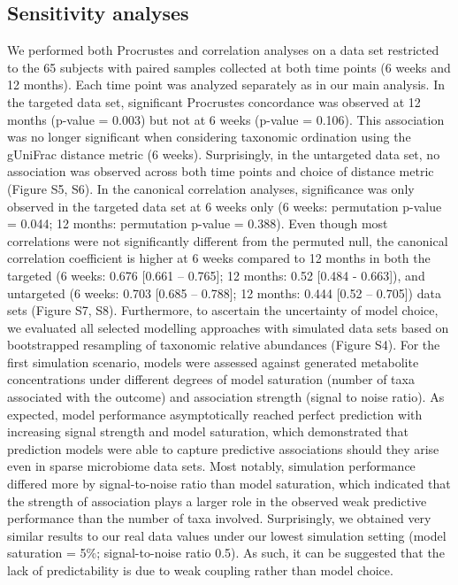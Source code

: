 \subsection{Sensitivity analyses}
We performed both Procrustes and correlation analyses on a data set restricted to the 65 subjects with paired samples collected at both time points (6 weeks and 12 months). Each time point was analyzed separately as in our main analysis. In the targeted data set, significant Procrustes concordance was observed at 12 months (p-value = 0.003) but not at 6 weeks (p-value = 0.106). This association was no longer significant when considering taxonomic ordination using the gUniFrac distance metric (6 weeks). Surprisingly, in the untargeted data set, no association was observed across both time points and choice of distance metric (Figure S5, S6). In the canonical correlation analyses, significance was only observed in the targeted data set at 6 weeks only (6 weeks: permutation p-value = 0.044; 12 months: permutation p-value = 0.388). Even though most correlations were not significantly different from the permuted null, the canonical correlation coefficient is higher at 6 weeks compared to 12 months in both the targeted (6 weeks: 0.676 [0.661 – 0.765]; 12 months: 0.52 [0.484 - 0.663]), and untargeted (6 weeks: 0.703 [0.685 – 0.788]; 12 months: 0.444 [0.52 – 0.705]) data sets (Figure S7, S8). 
Furthermore, to ascertain the uncertainty of model choice, we evaluated all selected modelling approaches with simulated data sets based on bootstrapped resampling of taxonomic relative abundances (Figure S4). For the first simulation scenario, models were assessed against generated metabolite concentrations under different degrees of model saturation (number of taxa associated with the outcome) and association strength (signal to noise ratio). As expected, model performance asymptotically reached perfect prediction with increasing signal strength and model saturation, which demonstrated that prediction models were able to capture predictive associations should they arise even in sparse microbiome data sets. Most notably, simulation performance differed more by signal-to-noise ratio than model saturation, which indicated that the strength of association plays a larger role in the observed weak predictive performance than the number of taxa involved. Surprisingly, we obtained very similar results to our real data values under our lowest simulation setting (model saturation = 5\%; signal-to-noise ratio 0.5). As such, it can be suggested that the lack of predictability is due to weak coupling rather than model choice. 
 
